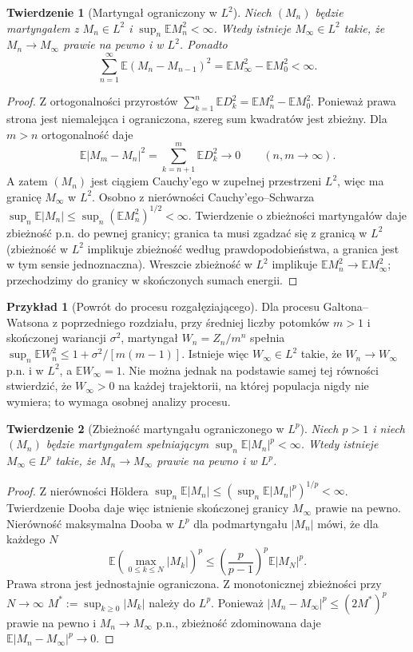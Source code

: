 \documentclass[11pt,a4paper,oneside]{report}
\numberwithin{equation}{chapter}
\theoremstyle{plain}
\newtheorem{twierdzenie}{Twierdzenie}[chapter]
\theoremstyle{definition}
\newtheorem{przyklad}{Przykład}[chapter]
\theoremstyle{remark}
\newcommand{\E}{\mathbb{E}}
\begin{document}
\begin{twierdzenie}[Martyngał ograniczony w $L^2$]
Niech $(M_n)$ będzie martyngałem z $M_n\in L^2$
i $\sup_n\E M_n^2<\infty$. Wtedy istnieje
$M_\infty\in L^2$ takie, że
$M_n\to M_\infty$ prawie na pewno i w $L^2$.
Ponadto
\[
\sum_{n=1}^{\infty}\E(M_n-M_{n-1})^2
=\E M_\infty^2-\E M_0^2<\infty.
\]
\end{twierdzenie}
\begin{proof}
Z ortogonalności przyrostów
$\sum_{k=1}^n\E D_k^2
=\E M_n^2-\E M_0^2$.
Ponieważ prawa strona jest niemalejąca
i ograniczona, szereg sum kwadratów jest
zbieżny. Dla $m>n$ ortogonalność daje
\[
\E|M_m-M_n|^2=\sum_{k=n+1}^m\E D_k^2\to0
\qquad(n,m\to\infty).
\]
A zatem $(M_n)$ jest ciągiem Cauchy'ego
w zupełnej przestrzeni $L^2$, więc ma granicę
$M_\infty$ w $L^2$. Osobno z nierówności
Cauchy'ego--Schwarza
$\sup_n\E|M_n|\leq\sup_n(\E M_n^2)^{1/2}<\infty$.
Twierdzenie o zbieżności martyngałów daje
zbieżność p.n. do pewnej granicy; granica ta
musi zgadzać się z granicą w $L^2$
(zbieżność w $L^2$ implikuje zbieżność według
prawdopodobieństwa, a granica jest w tym sensie
jednoznaczna). Wreszcie zbieżność w $L^2$
implikuje $\E M_n^2\to\E M_\infty^2$;
przechodzimy do granicy w skończonych
sumach energii.
\end{proof}

\begin{przyklad}[Powrót do procesu rozgałęziającego]
Dla procesu Galtona--Watsona z poprzedniego rozdziału,
przy średniej liczby potomków $m>1$ i
skończonej wariancji $\sigma^2$, martyngał
$W_n=Z_n/m^n$ spełnia
$\sup_n\E W_n^2\leq1+\sigma^2/[m(m-1)]$.
Istnieje więc $W_\infty\in L^2$ takie, że
$W_n\to W_\infty$ p.n. i w $L^2$, a
$\E W_\infty=1$. Nie można jednak na podstawie
samej tej równości stwierdzić, że
$W_\infty>0$ na każdej trajektorii,
na której populacja nigdy nie wymiera;
to wymaga osobnej analizy procesu.
\end{przyklad}

\begin{twierdzenie}[Zbieżność martyngału ograniczonego w $L^p$]
Niech $p>1$ i niech $(M_n)$ będzie martyngałem
spełniającym $\sup_n\E|M_n|^p<\infty$.
Wtedy istnieje $M_\infty\in L^p$ takie, że
$M_n\to M_\infty$ prawie na pewno i w $L^p$.
\end{twierdzenie}
\begin{proof}
Z nierówności Höldera
$\sup_n\E|M_n|\leq(\sup_n\E|M_n|^p)^{1/p}<\infty$.
Twierdzenie Dooba daje więc istnienie skończonej
granicy $M_\infty$ prawie na pewno.
Nierówność maksymalna Dooba w $L^p$ dla
podmartyngału $|M_n|$ mówi, że dla każdego $N$
\[
\E\left(\max_{0\leq k\leq N}|M_k|\right)^p
\leq\left(\frac{p}{p-1}\right)^p\E|M_N|^p.
\]
Prawa strona jest jednostajnie ograniczona.
Z monotonicznej zbieżności przy $N\to\infty$
$M^*:=\sup_{k\geq0}|M_k|$ należy do $L^p$.
Ponieważ $|M_n-M_\infty|^p\leq (2M^*)^p$
prawie na pewno i $M_n\to M_\infty$ p.n.,
zbieżność zdominowana daje
$\E|M_n-M_\infty|^p\to0$.
\end{proof}
\end{document}
